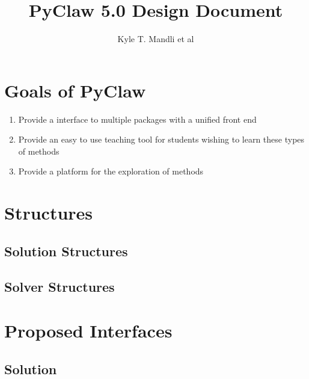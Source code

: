 \documentclass[]{article}
\title{PyClaw 5.0 Design Document}
\author{Kyle T. Mandli et al}
\date{}
\begin{document}
\ifpdf
{}
\else
{}
\fi


\section{Goals of PyClaw}
\begin{enumerate}
    \item Provide a interface to multiple packages with a unified front end
    \item Provide an easy to use teaching tool for students wishing to learn these types of methods
    \item Provide a platform for the exploration of methods
\end{enumerate}
\section{Structures}

\subsection{Solution Structures}

\subsection{Solver Structures}

\section{Proposed Interfaces}

\subsection{Solution}
\end{document}

